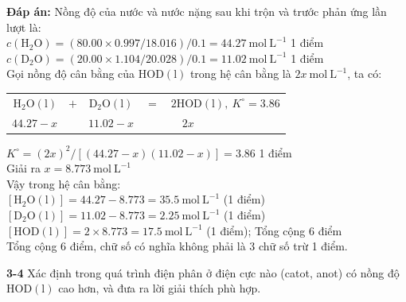 \begin{minipage}{\dimexpr\textwidth-2\fboxsep-2\fboxrule\relax}
\vspace{0.1cm}
\textbf{Đáp án:} Nồng độ của nước và nước nặng sau khi trộn và trước phản ứng lần lượt là: \\[0.1cm]
$c(\mathrm{H_2O}) = (80.00 \times 0.997 / 18.016) / 0.1 = 44.27\ \mathrm{mol\ L^{-1}}$ \hfill 1 điểm \\[0.1cm]
$c(\mathrm{D_2O}) = (20.00 \times 1.104 / 20.028) / 0.1 = 11.02\ \mathrm{mol\ L^{-1}}$ \hfill 1 điểm \\[0.1cm]
Gọi nồng độ cân bằng của $\mathrm{HOD(l)}$ trong hệ cân bằng là $2x\ \mathrm{mol\ L^{-1}}$, ta có:
\begin{center}
\begin{tabular}{rcccl}
 $\mathrm{H_2O(l)}$ & $+$ & $\mathrm{D_2O(l)}$ & $=$ & $2\mathrm{HOD(l)},\ K^\circ = 3.86$ \\
 $44.27 - x$ & & $11.02 - x$ & & $\quad 2x$
\end{tabular}
\end{center}
$K^\circ = (2x)^2 / [(44.27 - x)(11.02 - x)] = 3.86$ \hfill 1 điểm \\[0.1cm]
Giải ra $x = 8.773\ \mathrm{mol\ L^{-1}}$ \\[0.1cm]
Vậy trong hệ cân bằng: \\[0.1cm]
$[\mathrm{H_2O(l)}] = 44.27 - 8.773 = 35.5\ \mathrm{mol\ L^{-1}}$ (1 điểm) \\[0.1cm]
$[\mathrm{D_2O(l)}] = 11.02 - 8.773 = 2.25\ \mathrm{mol\ L^{-1}}$ (1 điểm) \\[0.1cm]
$[\mathrm{HOD(l)}] = 2 \times 8.773 = 17.5\ \mathrm{mol\ L^{-1}}$ (1 điểm); Tổng cộng 6 điểm \\[0.1cm]
Tổng cộng 6 điểm, chữ số có nghĩa không phải là 3 chữ số trừ 1 điểm.
\vspace{0.1cm}
\end{minipage}


\vspace{0.2cm}

\noindent
\textbf{3-4} Xác định trong quá trình điện phân ở điện cực nào (catot, anot) có nồng độ $\mathrm{HOD(l)}$ cao hơn, và đưa ra lời giải thích phù hợp.


\noindent{}

